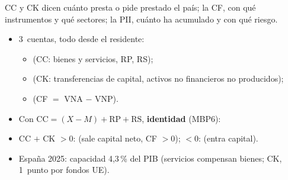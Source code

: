 \documentclass{article}
\begin{document}
\begin{columnas}
\begin{ideaclave}
CC y CK dicen cuánto presta o pide prestado el país; la CF, con qué instrumentos y qué sectores; la PII, cuánto ha acumulado y con qué riesgo.
\end{ideaclave}

\begin{itemize}
\item 3~cuentas, todo desde el residente:
  \begin{itemize}
  \item {} (CC: bienes y servicios, RP, RS);
  \item {} (CK: transferencias de capital, activos no financieros no producidos);
  \item {} (CF $=$ VNA $-$ VNP).
  \end{itemize}
\item Con $\mathrm{CC}=(X-M)+\mathrm{RP}+\mathrm{RS}$, \textbf{identidad} (MBP6):
\item CC $+$ CK $>0$:  (sale capital neto, CF $>0$); $<0$:  (entra capital).
\item España 2025: capacidad 4,3\,\% del PIB (servicios compensan bienes; CK, 1~punto por fondos UE).
\end{itemize}


\end{columnas}
\end{document}
